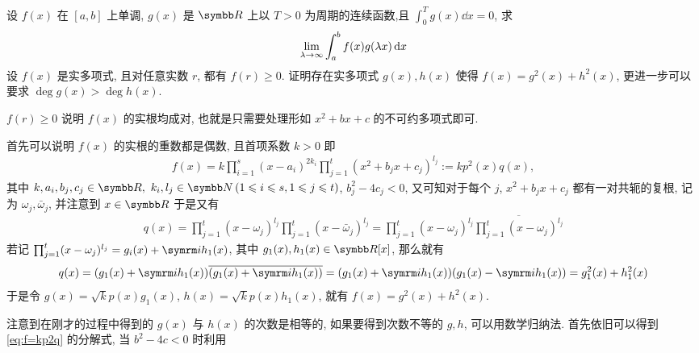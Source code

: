 \begin{exercise}[series=exer]
    \item 设 $ f(x) $ 在 $ [a, b] $ 上单调, $ g(x) $ 是 $ \R $ 上以 $ T>0 $ 为周期的连续函数,且 $ \int_{0}^{T} g(x) \dd{x} = 0 $, 求
    \begin{align*}
        \lim_{\lambda \to \infty} \int_{a}^{b} f(x)g(\lambda x) \dd{x}
    \end{align*}
    \sitem 设 $ f(x) $ 是实多项式, 且对任意实数 $ r $, 都有 $ f(r) \ge 0 $. 证明存在实多项式 $ g(x), h(x) $ 使得 $ f(x) = g^{2}(x) + h^{2}(x) $, 更进一步可以要求 $ \deg g(x) > \deg h(x) $.   
    \begin{hint}
        $ f(r) \ge 0 $ 说明 $ f(x) $ 的实根均成对, 也就是只需要处理形如 $ x^{2} + bx + c $ 的不可约多项式即可. 
    \end{hint}
    \begin{answer}
        \begin{answersheet}
            \item 首先可以说明 $ f(x) $ 的实根的重数都是偶数, 且首项系数 $ k > 0 $ 即
            \begin{align}
                f(x) = k\prod_{i = 1}^{s}(x - a_{i})^{2k_{i}}\prod_{j = 1}^{t}(x^{2} + b_{j}x + c_{j})^{l_{j}} := kp^{2}(x)q(x), \label{eq:f=kp2q}
            \end{align}
            其中 $ k, a_{i}, b_{j}, c_{j} \in \R,\ k_{i}, l_{j} \in \N \,(1 \le i \le s, 1 \le j \le t) $,  $ b_{j}^{2} - 4c_{j} < 0 $, 又可知对于每个 $ j $,  $ x^{2} + b_{j}x + c_{j} $ 都有一对共轭的复根, 记为 $ \omega_{j}, \bar{\omega}_{j} $, 并注意到 $ x \in \R $ 于是又有
            \begin{align*}
                q(x) = \prod_{j = 1}^{t} ( x - \omega_{j})^{l_{j}}\prod_{j = 1}^{t} ( x - \bar{\omega}_{j})^{l_{j}} = \prod_{j = 1}^{t} ( x - \omega_{j})^{l_{j}}\overline{\prod_{j = 1}^{t} ( x - \omega_{j})^{l_{j}}}
            \end{align*} 
            若记 $ \prod_{j = 1}^{t} ( x - \omega_{j})^{l_{j}} = g_{i}(x) + \mi h_{1}(x) $, 其中 $ g_{1}(x), h_{1}(x) \in \R[x] $, 那么就有
            \begin{align*}
                q(x) = (g_{1}(x) + \mi h_{1}(x))\overline{(g_{1}(x) + \mi h_{1}(x))} = (g_{1}(x) + \mi h_{1}(x))(g_{1}(x) - \mi h_{1}(x)) = g_{1}^{2}(x) + h_{1}^{2}(x)
            \end{align*}
            于是令 $ g(x) = \sqrt{k}p(x)g_{1}(x) $, $ h(x) = \sqrt{k}p(x)h_{1}(x) $, 就有 $ f(x) = g^{2}(x) + h^{2}(x) $. 
            \item 注意到在刚才的过程中得到的 $ g(x) $ 与 $ h(x) $ 的次数是相等的, 如果要得到次数不等的 $ g, h $, 可以用数学归纳法. 首先依旧可以得到 \eqref{eq:f=kp2q} 的分解式, 当 $ b^{2} - 4c < 0 $ 时利用

\end{answersheet}
\end{answer}
\end{exercise}
